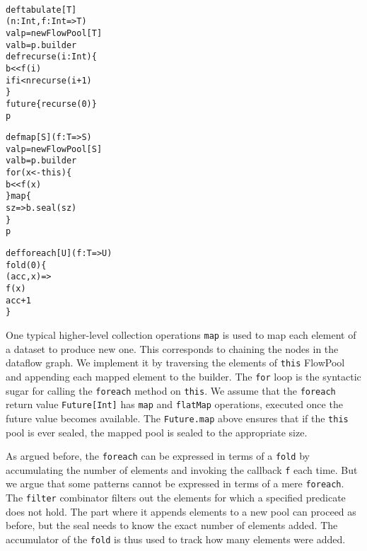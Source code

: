 \documentclass[runningheads,a4paper]{llncs}
\begin{document}
\noindent
\begin{minipage}[b]{4.2 cm}
\begin{alltt}
{\scriptsize
def tabulate[T]
  (n: Int, f: Int => T)
  val p = new FlowPool[T]
  val b = p.builder
  def recurse(i: Int) \{
    b << f(i)
    if i < n recurse(i + 1)
  \}
  future \{ recurse(0) \}
  p
}
\end{alltt}
\end{minipage}\begin{minipage}[b]{4 cm}
\begin{alltt}
{\scriptsize
def map[S](f: T => S)
  val p = new FlowPool[S]
  val b = p.builder
  for (x <- this) \{
    b << f(x)
  \} map \{
    sz => b.seal(sz)
  \}
  p

}
\end{alltt}
\end{minipage}
\begin{minipage}[b]{2.5 cm}
\begin{alltt}
{\scriptsize
def foreach[U](f: T => U)
  fold(0) \{
    (acc, x) =>
    f(x)
    acc + 1
  \}




}
\end{alltt}
\end{minipage}

One typical higher-level collection operations \verb=map= is used to
map each element of a dataset to produce new one.
This corresponds to chaining the nodes in the dataflow graph.
We implement it by traversing the elements of \verb=this= FlowPool and
appending each mapped element to the builder.
The \verb=for= loop is the syntactic sugar for calling the
\verb=foreach= method on \verb=this=.
We assume that the \verb=foreach= return value \verb=Future[Int]=
has \verb=map= and \verb=flatMap= operations, executed
once the future value becomes available.
The \verb=Future.map= above ensures that if the \verb=this= pool is ever
sealed, the mapped pool is sealed to the appropriate size.

As argued before, the \verb=foreach= can be expressed in terms of a
\verb=fold= by accumulating the number of elements and invoking the
callback \verb=f= each time.
But we argue that some patterns cannot be expressed in terms of a mere
\verb=foreach=.
The \verb=filter= combinator filters out the elements for which a
specified predicate does not hold.
The part where it appends elements to a new pool can proceed as
before, but the seal needs to know the exact number of elements added.
The accumulator of the \verb=fold= is thus used to track how many
elements were added.
\end{document}
